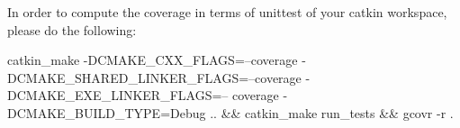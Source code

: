 In order to compute the coverage in terms of unittest of your catkin workspace, please do the following\+:


\begin{DoxyCode}
catkin\_make -DCMAKE\_CXX\_FLAGS=--coverage -DCMAKE\_SHARED\_LINKER\_FLAGS=--coverage -DCMAKE\_EXE\_LINKER\_FLAGS=--
      coverage -DCMAKE\_BUILD\_TYPE=Debug .. && catkin\_make run\_tests && gcovr -r .
\end{DoxyCode}
 
